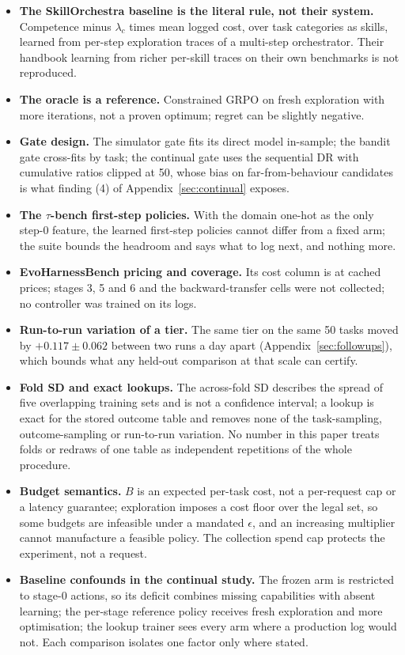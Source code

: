 \documentclass[10pt]{article}
\begin{document}
\begin{itemize}
\item \textbf{The SkillOrchestra baseline is the literal rule, not their system.} Competence minus $\lambda_c$ times mean logged cost, over task categories as skills, learned from per-step exploration traces of a multi-step orchestrator. Their handbook learning from richer per-skill traces on their own benchmarks is not reproduced.
\item \textbf{The oracle is a reference.} Constrained GRPO on fresh exploration with more iterations, not a proven optimum; regret can be slightly negative.
\item \textbf{Gate design.} The simulator gate fits its direct model in-sample; the bandit gate cross-fits by task; the continual gate uses the sequential DR with cumulative ratios clipped at 50, whose bias on far-from-behaviour candidates is what finding (4) of Appendix~\ref{sec:continual} exposes.
\item \textbf{The $\tau$-bench first-step policies.} With the domain one-hot as the only step-0 feature, the learned first-step policies cannot differ from a fixed arm; the suite bounds the headroom and says what to log next, and nothing more.
\item \textbf{EvoHarnessBench pricing and coverage.} Its cost column is at cached prices; stages 3, 5 and 6 and the backward-transfer cells were not collected; no controller was trained on its logs.
\item \textbf{Run-to-run variation of a tier.} The same tier on the same 50 tasks moved by $+0.117\pm0.062$ between two runs a day apart (Appendix~\ref{sec:followups}), which bounds what any held-out comparison at that scale can certify.
\item \textbf{Fold SD and exact lookups.} The across-fold SD describes the spread of five overlapping training sets and is not a confidence interval; a lookup is exact for the stored outcome table and removes none of the task-sampling, outcome-sampling or run-to-run variation. No number in this paper treats folds or redraws of one table as independent repetitions of the whole procedure.
\item \textbf{Budget semantics.} $B$ is an expected per-task cost, not a per-request cap or a latency guarantee; exploration imposes a cost floor over the legal set, so some budgets are infeasible under a mandated $\epsilon$, and an increasing multiplier cannot manufacture a feasible policy. The collection spend cap protects the experiment, not a request.
\item \textbf{Baseline confounds in the continual study.} The frozen arm is restricted to stage-0 actions, so its deficit combines missing capabilities with absent learning; the per-stage reference policy receives fresh exploration and more optimisation; the lookup trainer sees every arm where a production log would not. Each comparison isolates one factor only where stated.

\end{itemize}
\end{document}

